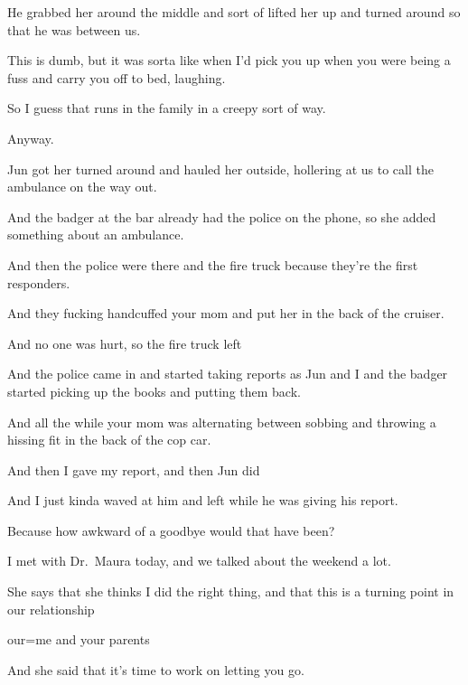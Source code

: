 { He grabbed her around the middle and sort of lifted her up and turned around so that he was between us.

 This is dumb, but it was sorta like when I'd pick you up when you were being a fuss and carry you off to bed, laughing.

 So I guess that runs in the family in a creepy sort of way.

 Anyway.

 Jun got her turned around and hauled her outside, hollering at us to call the ambulance on the way out.

 And the badger at the bar already had the police on the phone, so she added something about an ambulance.

 And then the police were there and the fire truck because they're the first responders.

 And they fucking handcuffed your mom and put her in the back of the cruiser.

 And no one was hurt, so the fire truck left

 And the police came in and started taking reports as Jun and I and the badger started picking up the books and putting them back.

 And all the while your mom was alternating between sobbing and throwing a hissing fit in the back of the cop car.

 And then I gave my report, and then Jun did

 And I just kinda waved at him and left while he was giving his report.

 Because how awkward of a goodbye would that have been?

 I met with Dr.~Maura today, and we talked about the weekend a lot.

 She says that she thinks I did the right thing, and that this is a turning point in our relationship

 our=me and your parents

 And she said that it's time to work on letting you go.

}
